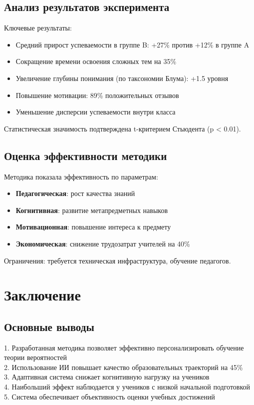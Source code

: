 \documentclass[a4paper,14pt]{extreport}
\begin{document}
\section{Анализ результатов эксперимента}
Ключевые результаты:
\begin{itemize}
    \item Средний прирост успеваемости в группе B: +27\% против +12\% в группе A
    \item Сокращение времени освоения сложных тем на 35\%
    \item Увеличение глубины понимания (по таксономии Блума): +1.5 уровня
    \item Повышение мотивации: 89\% положительных отзывов
    \item Уменьшение дисперсии успеваемости внутри класса
\end{itemize}
Статистическая значимость подтверждена t-критерием Стьюдента (p < 0.01).

\section{Оценка эффективности методики}
Методика показала эффективность по параметрам:
\begin{itemize}
    \item \textbf{Педагогическая}: рост качества знаний
    \item \textbf{Когнитивная}: развитие метапредметных навыков
    \item \textbf{Мотивационная}: повышение интереса к предмету
    \item \textbf{Экономическая}: снижение трудозатрат учителей на 40\%
\end{itemize}
Ограничения: требуется техническая инфраструктура, обучение педагогов.

\chapter*{Заключение}

\section*{Основные выводы}
1. Разработанная методика позволяет эффективно персонализировать обучение теории вероятностей\\
2. Использование ИИ повышает качество образовательных траекторий на 45\%\\
3. Адаптивная система снижает когнитивную нагрузку на учеников\\
4. Наибольший эффект наблюдается у учеников с низкой начальной подготовкой\\
5. Система обеспечивает объективность оценки учебных достижений
\end{document}
